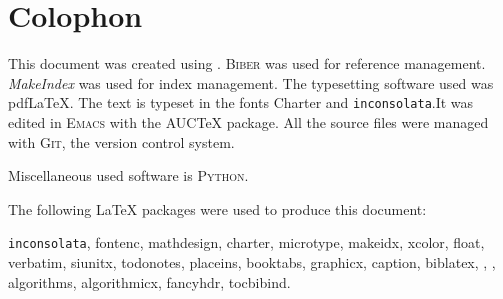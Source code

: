 \chapter*{Colophon}

This document was created using \LaTeXe{}. \textsc{Biber} was used for
reference management. \textit{MakeIndex} was used for index
management. The typesetting software used was pdf\LaTeX{}. The text is
typeset in the fonts Charter and \texttt{inconsolata}.It was edited in
\textsc{Emacs} with the AUC\TeX{} package. All the source files were
managed with \textsc{Git}, the version control
system.

Miscellaneous used software is \textsc{Python}.

The following \LaTeX{} packages were used to produce this document:

\texttt{inconsolata}, fontenc, mathdesign, charter, microtype,
makeidx, xcolor, float, verbatim, siunitx, todonotes, placeins,
booktabs, graphicx, caption, biblatex, \tikzname, \pgf , algorithms,
algorithmicx, fancyhdr, tocbibind.

